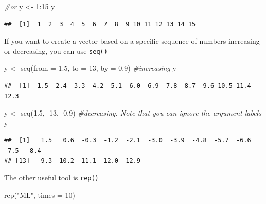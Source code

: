 \documentclass[
]{book}
\newenvironment{Shaded}{\begin{snugshade}}{\end{snugshade}}
\newcommand{\AttributeTok}[1]{\textcolor[rgb]{0.77,0.63,0.00}{#1}}
\newcommand{\CommentTok}[1]{\textcolor[rgb]{0.56,0.35,0.01}{\textit{#1}}}
\newcommand{\DecValTok}[1]{\textcolor[rgb]{0.00,0.00,0.81}{#1}}
\newcommand{\FloatTok}[1]{\textcolor[rgb]{0.00,0.00,0.81}{#1}}
\newcommand{\FunctionTok}[1]{\textcolor[rgb]{0.00,0.00,0.00}{#1}}
\newcommand{\NormalTok}[1]{#1}
\newcommand{\OtherTok}[1]{\textcolor[rgb]{0.56,0.35,0.01}{#1}}
\newcommand{\SpecialCharTok}[1]{\textcolor[rgb]{0.00,0.00,0.00}{#1}}
\newcommand{\StringTok}[1]{\textcolor[rgb]{0.31,0.60,0.02}{#1}}
\theoremstyle{definition}
\theoremstyle{definition}
\theoremstyle{definition}
\theoremstyle{definition}
\theoremstyle{remark}
\begin{document}
\begin{Shaded}
\begin{Highlighting}[]
\CommentTok{\#or}
\NormalTok{y }\OtherTok{\textless{}{-}} \DecValTok{1}\SpecialCharTok{:}\DecValTok{15}
\NormalTok{y}
\end{Highlighting}
\end{Shaded}

\begin{verbatim}
##  [1]  1  2  3  4  5  6  7  8  9 10 11 12 13 14 15
\end{verbatim}

If you want to create a vector based on a specific sequence of numbers increasing or decreasing, you can use \texttt{seq()}

\begin{Shaded}
\begin{Highlighting}[]
\NormalTok{y }\OtherTok{\textless{}{-}} \FunctionTok{seq}\NormalTok{(}\AttributeTok{from =} \FloatTok{1.5}\NormalTok{, }\AttributeTok{to =} \DecValTok{13}\NormalTok{, }\AttributeTok{by =} \FloatTok{0.9}\NormalTok{) }\CommentTok{\#increasing}
\NormalTok{y}
\end{Highlighting}
\end{Shaded}

\begin{verbatim}
##  [1]  1.5  2.4  3.3  4.2  5.1  6.0  6.9  7.8  8.7  9.6 10.5 11.4 12.3
\end{verbatim}

\begin{Shaded}
\begin{Highlighting}[]
\NormalTok{y }\OtherTok{\textless{}{-}} \FunctionTok{seq}\NormalTok{(}\FloatTok{1.5}\NormalTok{, }\SpecialCharTok{{-}}\DecValTok{13}\NormalTok{, }\SpecialCharTok{{-}}\FloatTok{0.9}\NormalTok{) }\CommentTok{\#decreasing.  Note that you can ignore the argument labels}
\NormalTok{y}
\end{Highlighting}
\end{Shaded}

\begin{verbatim}
##  [1]   1.5   0.6  -0.3  -1.2  -2.1  -3.0  -3.9  -4.8  -5.7  -6.6  -7.5  -8.4
## [13]  -9.3 -10.2 -11.1 -12.0 -12.9
\end{verbatim}

The other useful tool is \texttt{rep()}

\begin{Shaded}
\begin{Highlighting}[]
\FunctionTok{rep}\NormalTok{(}\StringTok{"ML"}\NormalTok{, }\AttributeTok{times =} \DecValTok{10}\NormalTok{)}
\end{Highlighting}
\end{Shaded}
\end{document}
